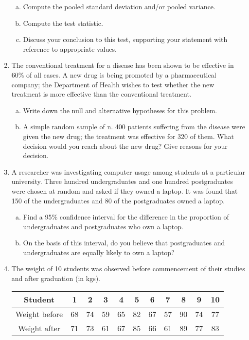 \documentclass[]{article}
\begin{document}
\begin{enumerate}
\begin{enumerate}[(a)]
	\item Compute the pooled standard deviation and/or pooled variance.
	\item Compute the test statistic.
	\item Discuss your conclusion to this test, supporting your statement with reference to appropriate values.
\end{enumerate}	

\item 
The conventional treatment for a disease has been shown to be effective in 60\% of all cases. A new drug is being promoted by a pharmaceutical company; the Department of Health wishes to test whether the new treatment is more effective than the conventional treatment. 
\begin{enumerate}[(a)]
    \item Write down the null and alternative hypotheses for this problem. \item  A simple random sample of n. 400 patients suffering from the disease were given the new drug; the treatment was effective for 320 of them. What decision would you reach about the new drug? Give reasons for your decision. 
    \end{enumerate}
\item 

A researcher was investigating computer usage among students at a particular university. Three hundred undergraduates and one hundred postgraduates were chosen at random and asked if they owned a laptop. It was found that 150 of the undergraduates and 80 of the postgraduates owned a laptop. 
\begin{enumerate}[(a)]
    \item Find a 95\% confidence interval for the difference in the proportion of undergraduates and postgraduates who own a laptop. 
    \item On the basis of this interval, do you believe that postgraduates and undergraduates are equally likely to own a laptop? 
\end{enumerate}


\item 

The weight of 10 students was observed before commencement of their studies and after graduation (in kgs).

\begin{center}
    \begin{tabular}{|c||c|c|c|c|c|c|c|c|c|c|} \hline 
Student &	1&	2	&3	&4	&5	&6	&7	&8	&9	&10\\ \hline 
Weight before &	68	& 74	& 59	& 65	& 82&67&57&90&74&77\\ \hline 
Weight after&71&73&61&67&85&66&61&89&77&83\\ \hline 
\end{tabular}
\end{center}



\end{enumerate}
\end{document}
